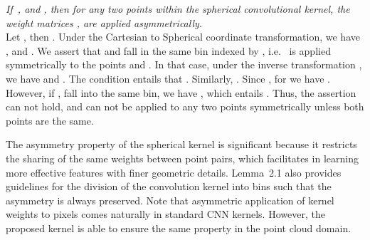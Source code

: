 \documentclass[10pt,twocolumn,letterpaper]{article}
\begin{document}
 \emph{If~,   and , then for any two points  within the spherical convolutional kernel, the weight matrices , are applied asymmetrically.}\\
Let , then .  Under the Cartesian to Spherical coordinate transformation,  we have ,  and . We assert that  and  fall in the same bin indexed by , i.e.~ is applied symmetrically to the points  and .
In that case, under the inverse transformation , we have  and .
The condition  entails that . Similarly,
.
Since , for   we have .
However, if  ,  fall into the same bin, we have , which entails .  Thus, the assertion can not hold, and  can not be applied to any two points symmetrically  unless both points are the same.

The asymmetry property of the spherical  kernel is significant because it restricts the sharing of the same weights between point pairs, which facilitates in learning more effective features with finer geometric details.
Lemma~2.1 also provides guidelines for the division of the convolution kernel into bins such that the asymmetry is always preserved.
Note that asymmetric application of kernel weights to pixels comes naturally in standard CNN kernels. However, the proposed kernel is able to ensure the same property in the point cloud domain.
\vspace{1mm}
\end{document}
